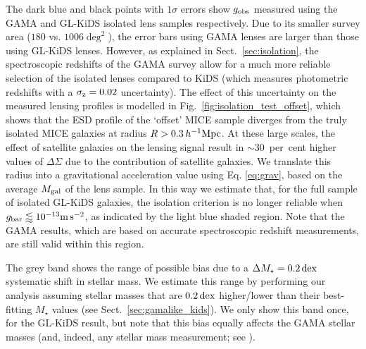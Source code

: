 \documentclass[usenatbib]{mnras}
\newcommand{\hMpc}{\, h^{-1}{\rm{Mpc}} }
\newcommand{\mpss}{ {\rm m}\,{\rm s}^{-2} }
\newcommand{\un}[1]{_{\rm #1}}
\newcommand{\dex}{\, {\rm dex}}
\begin{document}
The dark blue and black points with $1\sigma$ errors show $g\un{obs}$ measured using the GAMA and GL-KiDS isolated lens samples respectively. Due to its smaller survey area ($180$ vs. $1006 \deg^2$), the error bars using GAMA lenses are larger than those using GL-KiDS lenses. However, as explained in Sect.~\ref{sec:isolation}, the spectroscopic redshifts of the GAMA survey allow for a much more reliable selection of the isolated lenses compared to KiDS (which measures photometric redshifts with a $\sigma\un{z}=0.02$ uncertainty). The effect of this uncertainty on the measured lensing profiles is modelled in Fig.~\ref{fig:isolation_test_offset}, which shows that the ESD profile of the `offset' MICE sample diverges from the truly isolated MICE galaxies at radius $R > 0.3 \hMpc$. At these large scales, the effect of satellite galaxies on the lensing signal result in $\sim30$~per~cent higher values of $\Delta\Sigma$ due to the contribution of satellite galaxies. We translate this radius into a gravitational acceleration value using Eq. \ref{eq:grav}, based on the average $M\un{gal}$ of the lens sample. In this way we estimate that, for the full sample of isolated GL-KiDS galaxies, the isolation criterion is no longer reliable when $g\un{bar} \lessapprox 10^{-13} \mpss$, as indicated by the light blue shaded region. Note that the GAMA results, which are based on accurate spectroscopic redshift measurements, are still valid within this region.

The grey band shows the range of possible bias due to a $\Delta M_\star=0.2 \dex$ systematic shift in stellar mass. We estimate this range by performing our analysis assuming stellar masses that are $0.2 \dex$ higher/lower than their best-fitting $M_\star$ values (see Sect.~\ref{sec:gamalike_kids}). We only show this band once, for the GL-KiDS result, but note that this bias equally affects the GAMA stellar masses (and, indeed, any stellar mass measurement; see \citealt{wright2017}).
\end{document}
